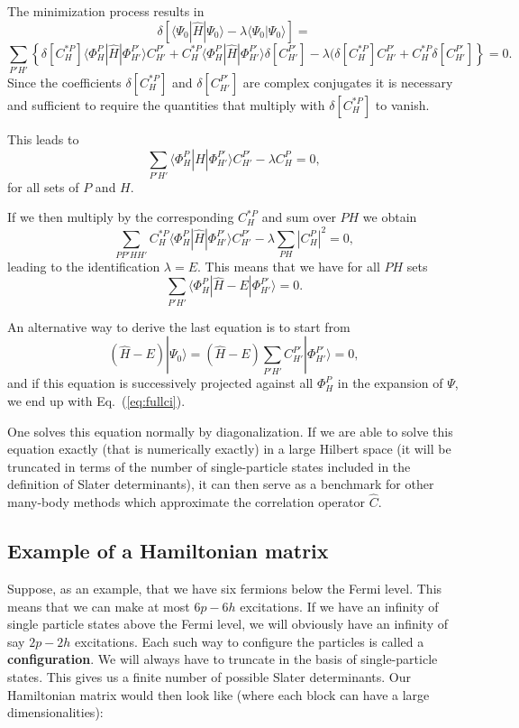 The minimization process results in 
\[
\delta\left[ \langle \Psi_0 | \hat{H} |\Psi_0 \rangle-\lambda \langle \Psi_0 |\Psi_0 \rangle\right]=
\]
\[
\sum_{P'H'}\left\{\delta[C_H^{*P}]\langle \Phi_H^P | \hat{H} |\Phi_{H'}^{P'} \rangle C_{H'}^{P'}+
C_H^{*P}\langle \Phi_H^P | \hat{H} |\Phi_{H'}^{P'} \rangle \delta[C_{H'}^{P'}]-
\lambda( \delta[C_H^{*P}]C_{H'}^{P'}+C_H^{*P}\delta[C_{H'}^{P'}]\right\} = 0.
\]
Since the coefficients $\delta[C_H^{*P}]$ and $\delta[C_{H'}^{P'}]$ are complex conjugates it is necessary and sufficient to require the quantities that multiply with $\delta[C_H^{*P}]$ to vanish.  

This leads to 
\[
\sum_{P'H'}\langle \Phi_H^P | \hat{H} |\Phi_{H'}^{P'} \rangle C_{H'}^{P'}-\lambda C_H^{P}=0,
\]
for all sets of $P$ and $H$.

If we then multiply by the corresponding $C_H^{*P}$ and sum over $PH$ we obtain
\[ 
\sum_{PP'HH'}C_H^{*P}\langle \Phi_H^P | \hat{H} |\Phi_{H'}^{P'} \rangle C_{H'}^{P'}-\lambda\sum_{PH}|C_H^P|^2=0,
\]
leading to the identification $\lambda = E$. This means that we have for all $PH$ sets
\begin{equation}
\sum_{P'H'}\langle \Phi_H^P | \hat{H} -E|\Phi_{H'}^{P'} \rangle = 0. \label{eq:fullci}
\end{equation}



An alternative way to derive the last equation is to start from 
\[
(\hat{H} -E)|\Psi_0\rangle = (\hat{H} -E)\sum_{P'H'}C_{H'}^{P'}|\Phi_{H'}^{P'} \rangle=0, 
\]
and if this equation is successively projected against all $\Phi_H^P$ in the expansion of $\Psi$, we end up with Eq.~(\ref{eq:fullci}).

One solves this equation normally by diagonalization. If we are able to solve this equation exactly (that is
numerically exactly) in a large Hilbert space (it will be truncated in terms of the number of single-particle states included in the definition
of Slater determinants), it can then serve as a benchmark for other many-body methods which approximate the correlation operator
$\hat{C}$.  


\subsection{Example of a Hamiltonian matrix}

Suppose, as an example, that we have six fermions below the Fermi level.
This means that we can make at most $6p-6h$ excitations. If we have an infinity of single particle states above the Fermi level, we will obviously have an infinity of say $2p-2h$ excitations. Each such way to configure the particles is called a \textbf{configuration}. We will always have to truncate in the basis of single-particle states.
This gives us a finite number of possible Slater determinants. Our Hamiltonian matrix would then look like (where each block can have a large dimensionalities):


